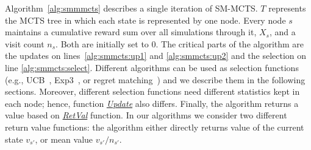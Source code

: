 Algorithm~\ref{alg:smmmcts} describes a single iteration of SM-MCTS. $T$ represents the MCTS tree in which
each state is represented by one node. Every node $s$ maintains a cumulative reward sum over all
simulations through it, $X_s$, and a visit count $n_s$. Both are initially set to $0$. The critical parts of the
algorithm are the updates on lines~\ref{alg:smmcts:up1} and \ref{alg:smmcts:up2} and the selection on line \ref{alg:smmcts:select}. 
Different algorithms can be used as selection functions (e.g., UCB~\cite{UCB}, Exp3~\cite{Auer2003Exp3}, or regret matching~\cite{Hart00}) and we describe them in the following sections. 
Moreover, different selection functions need different statistics kept in each node; hence, function \emph{\underline{Update}} also differs. 
Finally, the algorithm returns a value based on \emph{\underline{RetVal}} function. 
In our algorithms we consider two different return value functions: the algorithm either directly returns value of the current state $v_{s'}$, or mean value $v_{s'}/n_{s'}$.
